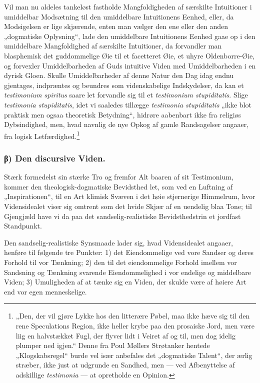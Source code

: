 \documentclass[11pt]{book}
\newcommand{\opage}[1]{\marginnote{\footnotesize\textit{[#1]}}}
\begin{document}
Vil man nu aldeles tankeløst fastholde Mangfoldigheden af særskilte
Intuitioner i umiddelbar Modsætning til den umiddelbare Intuitionens
Eenhed, eller, da Modsigelsen er lige skjærende, enten man vælger den
ene eller den anden „dogmatiske Oplysning“, lade den umiddelbare
Intuitionens Eenhed gaae op i den umiddelbare Mangfoldighed af særskilte
Intuitioner, da forvandler man blasphemisk det guddommelige Øie til et
facetteret Øie, et uhyre Oldenborre-Øie, og forvexler Umiddelbarheden af
Guds intuitive Viden med Umiddelbarheden
\opage{243} \setcounter{footnote}{0}%
i en dyrisk Gloen. Skulle Umiddelbarheder af denne Natur den Dag idag
endnu gjentages, indpræntes og beundres som videnskabelige
Indskydelser, da kan et \textit{testimonium spiritus} saare let
forvandle sig til et \textit{testimonium stupiditatis}. Slige
\textit{testimonia stupiditatis}, idet vi saaledes tillægge
\textit{testimonia stupiditatis} „ikke blot praktisk men ogsaa
theoretisk Betydning“, hidrøre aabenbart ikke fra religiøs
Dybsindighed, men, hvad navnlig de nye Opkog af gamle Randsagelser
angaaer, fra logisk
Letfærdighed.\footnote{„Den, der vil gjøre Lykke hos den litterære
Pøbel, maa ikke hæve sig til den rene Speculations Region, ikke heller
krybe paa den prosaiske Jord, men være liig en halvstækket Fugl, der
flyver lidt i Veiret af og til, men dog idelig plumper ned igjen.“
Denne fra Poul Møllers Strøtanker hentede „Klogskabsregel“ burde vel
især anbefales det „dogmatiske Talent“, der ærlig stræber, ikke just at
udgrunde en Sandhed, men --- ved Afbenyttelse af adskillige
\textit{testimonia} --- at opretholde en Opinion.}%

\subsubsection*{β) Den discursive Viden.}

Stærk formedelst sin stærke Tro og fremfor Alt baaren af sit
Testimonium, kommer den theologisk-dogmatiske Bevidsthed let, som ved en
Luftning af „Inspirationen“, til en Art klimisk Svæven i det høie
stjernerige Himmelrum, hvor Vidensidealet viser sig omtrent som det
hvide Skjær af en uendelig blaa Tone; til Gjengjæld have vi da paa det
sandselig-realistiske Bevidsthedstrin et jordfast Standpunkt.

Den sandselig-realistiske Synsmaade lader sig, hvad Vidensidealet
angaaer, henføre til følgende tre Punkter: 1) det Eiendommelige ved vore
Sandser og deres Forhold til vor Tænkning; 2) den til det eiendommelige
Forhold imellem vor Sandsning og Tænkning svarende Eiendommelighed i vor
endelige og middelbare Viden; 3) Umuligheden af at tænke sig en Viden,
der skulde være af høiere Art end vor egen menneskelige.
\end{document}
